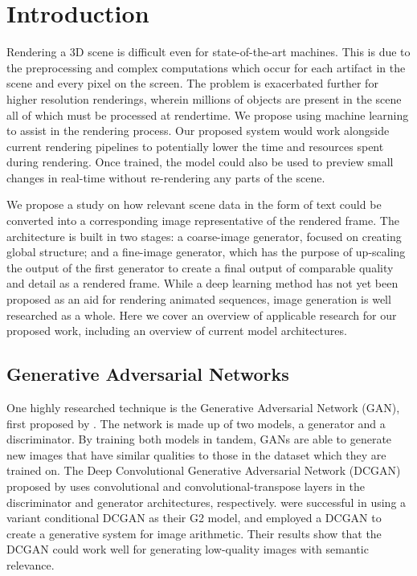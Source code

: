 \documentclass{article}
\begin{document}
\section{Introduction}
\label{sec:introduction}
Rendering a 3D scene is difficult
even for state-of-the-art machines. This is due to the
preprocessing and complex computations which occur for each
artifact in the scene and every pixel on the screen. The problem is exacerbated
further for higher resolution renderings, wherein millions of objects are present
in the scene all of which must be processed at rendertime.
We propose using machine learning to assist in the rendering process.
Our proposed system would work alongside current rendering pipelines
to potentially lower the time and resources spent during rendering.
Once trained, the model could also be used to preview small changes in
real-time without re-rendering any parts of the scene.

We propose a study on how relevant scene data in the form of text could be
converted into a corresponding image representative of the rendered frame.
The architecture is built in two stages: a coarse-image generator, focused on
creating global structure; and a fine-image generator, which has the purpose
of up-scaling the output of the first generator to create a final output
of comparable quality and detail as a rendered frame.
While a deep learning method has not yet been proposed as an aid for rendering
animated sequences, image generation is well researched as a whole.
Here we cover an overview of applicable research for our proposed work,
including an overview of current model architectures.

\subsection{Generative Adversarial Networks}
\label{subsec:gan}
One highly researched technique is the Generative Adversarial Network (GAN),
first proposed by \cite{generative_adversarial_networks}.
The network is made up of two models,
a generator and a discriminator.
By training both models in tandem,
GANs are able to generate new images that have similar qualities to
those in the dataset which they are trained on.
The Deep Convolutional Generative Adversarial Network (DCGAN)
proposed by \cite{unsupervised_learning}
uses convolutional and convolutional-transpose layers in
the discriminator and generator architectures, respectively.
\cite{pose_guided_image_generation} were successful in using
a variant conditional DCGAN as their G2 model, and
\cite{unsupervised_learning} employed a DCGAN to
create a generative system for image arithmetic.
Their results show that the DCGAN could work well
for generating low-quality images with semantic relevance.
\end{document}
